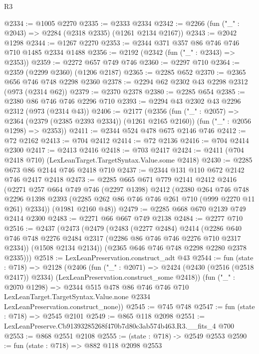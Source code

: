 \begin{lexlean}{R3}
\begin{coremodule}
@2334 := @1005 @2270
@2335 := @2333 @2334
@2342 := @2266 (fun ("_" : @2043) => @2284 (@2318 @2335) (@1261 @2134 @2167))
@2343 := @2042 @1298
@2344 := @1267 @2270
@2353 := @2344 @371 @357 @86 @746 @746 @710 @1485 @2334 @1488
@2356 := @2192 (@2342 (fun ("_" : @2343) => @2353))
@2359 := @2272 @657 @749 @746
@2360 := @2297 @710
@2364 := @2359 (@2299 @2360) (@1206 @2187)
@2365 := @2285 @652
@2370 := @2365 @656 @746 @748 @2298 @2360
@2378 := @2294 @62 @2302 @43 @2298 @2312 (@973 (@2314 @62))
@2379 := @2370 @2378
@2380 := @2285 @654
@2385 := @2380 @86 @746 @746 @2296 @710
@2393 := @2294 @43 @2302 @43 @2296 @2312 (@973 (@2314 @43))
@2406 := @2177
    (@2356
      (fun ("_" : @2057) => @2364 (@2379 (@2385 @2393 @2334)) (@1261 @2165 @2160))
      (fun ("_" : @2056 @1298) => @2353))
@2411 := @2344 @524 @478 @675 @2146 @746
@2412 := @72 @2162
@2413 := @704 @2412
@2414 := @72 @2136
@2416 := @704 @2414 @2300
@2417 := @2413 @2416
@2418 := @703 @2417
@2424 := @2411 (@704 @2418 @710) (LexLeanTarget.TargetSyntax.Value.some @2418)
@2430 := @2285 @673 @86 @2144 @746 @2418 @710
@2437 := @2344 @131 @110 @672 @2142 @746 @2417 @2418
@2473 := @2285
    @665
    @671
    @779
    @2141
    @2412
    @2416
    (@2271
      @257
      @664
      @749
      @746
      (@2297 @1398)
      @2412
      (@2380
        @264
        @746
        @748
        @2296
        @1398
        @2393
        (@2285 @262 @86 @746 @746 @261 @710 (@999 @2270 @11 @261) @2334))
      (@1981 @2160 @48))
@2479 := @2285 @668 @670 @2139 @749 @2414 @2300
@2483 := @2271 @66 @667 @749 @2138
@2484 := @2277 @710
@2516 := @2437
    (@2473
      (@2479
        (@2483
          (@2277 @2484)
          @2414
          (@2286 @640 @746 @748 @2276 @2484 @2317 (@2286 @86 @746 @746 @2276 @710 @2317 @2334))
          (@1508 @2134 @2134))
        (@2365 @646 @746 @748 @2298 @2280 @2378 @2335)))
@2518 := LexLeanPreservation.construct_adt @43
@2544 := fun (state : @718) =>
  @2128
    (@2406
      (fun ("_" : @2071) =>
      @2424 (@2430 (@2516 (@2518 @2417)) @2334) (LexLeanPreservation.construct_some @2418))
      (fun ("_" : @2070 @1298) =>
      @2344
        @515
        @478
        @86
        @746
        @746
        @710
        LexLeanTarget.TargetSyntax.Value.none
        @2334
        LexLeanPreservation.construct_none))
@2545 := @745 @748
@2547 := fun (state : @718) => @2545 @2101
@2549 := @865 @118 @2098
@2551 := LexLeanPreserve.Cb91393285268f470b7d80c3ab574b463.R3.__fits_4 @700
@2553 := @868 @2551 @2108
@2555 := (state : @718) -> @2549 @2553
@2590 := fun (state : @718) =>
  @882
    @118
    @2098
    @2553

\end{coremodule}
\end{lexlean}
